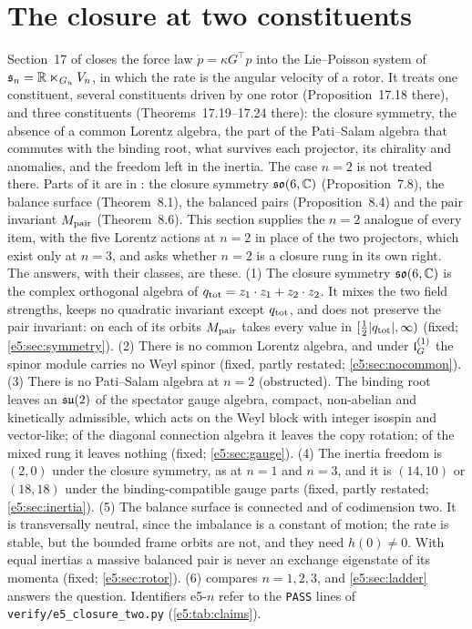 \section{The closure at two constituents}
\label{e5:sec:main}

Section~17 of \cite{ES17} closes the force law $\dot p=\kappa G^{\!\top}p$ into the Lie--Poisson system of $\mathfrak s_n=\mathbb{R}\ltimes_{G_n}V_n$,
in which the rate is the angular velocity of a rotor. It treats one constituent, several constituents driven by one rotor
(Proposition~17.18 there), and three constituents (Theorems~17.19--17.24 there): the closure symmetry, the absence of a common Lorentz
algebra, the part of the Pati--Salam algebra that commutes with the binding root, what survives each projector, its chirality and
anomalies, and the freedom left in the inertia. The case $n=2$ is not treated there. Parts of it are in \cite{RE}: the closure
symmetry $\mathfrak{so}(6,\mathbb{C})$ (Proposition~7.8), the balance surface (Theorem~8.1), the balanced pairs (Proposition~8.4) and the pair invariant
$M_{\rm pair}$ (Theorem~8.6). This section supplies the $n=2$ analogue of every item, with the five Lorentz actions at $n=2$ in place of the two
projectors, which exist only at $n=3$, and asks whether $n=2$ is a closure rung in its own right. The answers, with their classes, are these. (1) The closure symmetry $\mathfrak{so}(6,\mathbb{C})$ is the complex orthogonal algebra of
$q_{\rm tot}=z_1\cdot z_1+z_2\cdot z_2$. It mixes the two field strengths, keeps no quadratic invariant except $q_{\rm tot}$, and does not
preserve the pair invariant: on each of its orbits $M_{\rm pair}$ takes every value in $[\tfrac12|q_{\rm tot}|,\infty)$ (fixed;
\cref{e5:sec:symmetry}). (2) There is no common Lorentz algebra, and under $\mathfrak l_G^{(1)}$ the spinor module carries no Weyl spinor
(fixed, partly restated; \cref{e5:sec:nocommon}). (3) There is no Pati--Salam algebra at $n=2$ (obstructed). The binding root leaves an
$\mathfrak{su}(2)$ of the spectator gauge algebra, compact, non-abelian and kinetically admissible, which acts on the Weyl block with integer
isospin and vector-like; of the diagonal connection algebra it leaves the copy rotation; of the mixed rung it leaves nothing (fixed;
\cref{e5:sec:gauge}). (4) The inertia freedom is $(2,0)$ under the closure symmetry, as at $n=1$ and $n=3$, and it is $(14,10)$ or $(18,18)$
under the binding-compatible gauge parts (fixed, partly restated; \cref{e5:sec:inertia}). (5) The balance surface is connected and of
codimension two. It is transversally neutral, since the imbalance is a constant of motion; the rate is stable, but the bounded frame orbits
are not, and they need $h(0)\neq0$. With equal inertias a massive balanced pair is never an exchange eigenstate of its momenta
(fixed; \cref{e5:sec:rotor}).
(6)  compares $n=1,2,3$, and \cref{e5:sec:ladder} answers the question. Identifiers e5-$n$ refer to the \texttt{PASS}
lines of \texttt{verify/e5\_closure\_two.py} (\cref{e5:tab:claims}).

